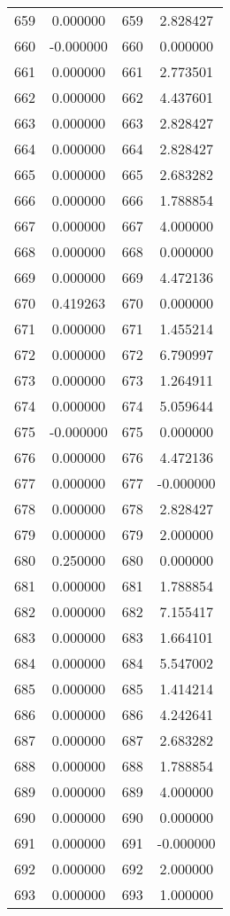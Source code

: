 \documentclass[12pt]{article}
\begin{document}
\begin{longtable}{@{}cccc@{}}
659 & 0.000000 & 659 & 2.828427 \\
660 & -0.000000 & 660 & 0.000000 \\
661 & 0.000000 & 661 & 2.773501 \\
662 & 0.000000 & 662 & 4.437601 \\
663 & 0.000000 & 663 & 2.828427 \\
664 & 0.000000 & 664 & 2.828427 \\
665 & 0.000000 & 665 & 2.683282 \\
666 & 0.000000 & 666 & 1.788854 \\
667 & 0.000000 & 667 & 4.000000 \\
668 & 0.000000 & 668 & 0.000000 \\
669 & 0.000000 & 669 & 4.472136 \\
670 & 0.419263 & 670 & 0.000000 \\
671 & 0.000000 & 671 & 1.455214 \\
672 & 0.000000 & 672 & 6.790997 \\
673 & 0.000000 & 673 & 1.264911 \\
674 & 0.000000 & 674 & 5.059644 \\
675 & -0.000000 & 675 & 0.000000 \\
676 & 0.000000 & 676 & 4.472136 \\
677 & 0.000000 & 677 & -0.000000 \\
678 & 0.000000 & 678 & 2.828427 \\
679 & 0.000000 & 679 & 2.000000 \\
680 & 0.250000 & 680 & 0.000000 \\
681 & 0.000000 & 681 & 1.788854 \\
682 & 0.000000 & 682 & 7.155417 \\
683 & 0.000000 & 683 & 1.664101 \\
684 & 0.000000 & 684 & 5.547002 \\
685 & 0.000000 & 685 & 1.414214 \\
686 & 0.000000 & 686 & 4.242641 \\
687 & 0.000000 & 687 & 2.683282 \\
688 & 0.000000 & 688 & 1.788854 \\
689 & 0.000000 & 689 & 4.000000 \\
690 & 0.000000 & 690 & 0.000000 \\
691 & 0.000000 & 691 & -0.000000 \\
692 & 0.000000 & 692 & 2.000000 \\
693 & 0.000000 & 693 & 1.000000 \\

\end{longtable}
\end{document}
